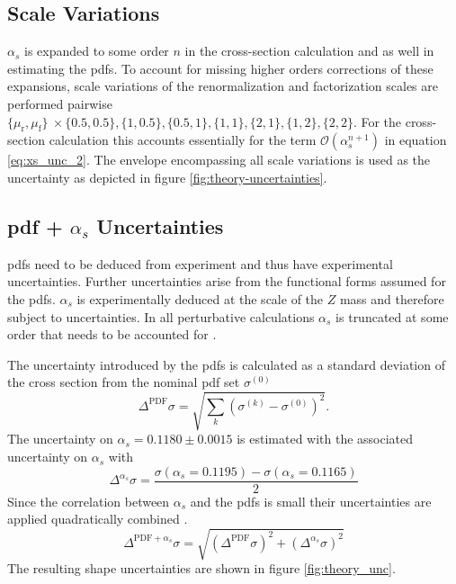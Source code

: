 \subsection{Scale Variations}
$\alpha_s$ is expanded to some order $n$ in the cross-section calculation and as well in estimating the \acp{pdf}. To account for missing higher orders corrections of these expansions, scale variations of the renormalization and factorization scales are performed pairwise $\{\mu_\text{r},\mu_\text{f}\}\ \times \{0.5,0.5\}, \{1,0.5\}, \{0.5,1\}, \{1,1\}, \{2,1\}, \{1,2\}, \{2,2\}$. For the cross-section calculation this accounts essentially for the term $\mathcal{O}(\alpha_s^{n+1})$ in equation \ref{eq:xs_unc_2}. The envelope encompassing all scale variations is used as the uncertainty as depicted in figure \ref{fig:theory-uncertainties}.


\subsection{\ac{pdf} + $\alpha_s$ Uncertainties}
\acp{pdf} need to be deduced from experiment and thus have experimental uncertainties. Further uncertainties arise from the functional forms assumed for the \acp{pdf}. $\alpha_s$ is  experimentally deduced at the scale of the $Z$ mass and therefore subject to uncertainties. In all perturbative calculations $\alpha_s$ is truncated at some order that needs to be accounted for \citep{unc_recipe,Butterworth_2016}.

The uncertainty introduced by the \acp{pdf} is calculated as a standard deviation of the cross section from the nominal \ac{pdf} set $\sigma^{(0)}$ \citep{Butterworth_2016}
\begin{equation}
    \Delta^\text{PDF}\sigma = \sqrt{\sum_k \left(\sigma^{(k)} - \sigma^{(0)}\right)^2}.
\end{equation}
The uncertainty on $\alpha_s=0.1180\pm0.0015$ is estimated with the associated uncertainty on $\alpha_s$ with
\begin{equation}
    \Delta^{\alpha_s}\sigma = \frac{\sigma(\alpha_s=0.1195)-\sigma(\alpha_s=0.1165)}{2}
\end{equation}
Since the correlation between $\alpha_s$ and the \acp{pdf} is small their uncertainties are applied quadratically combined \citep{unc_recipe,Butterworth_2016}.
\begin{equation}
    \Delta^{\text{PDF}+\alpha_s}\sigma=\sqrt{(\Delta^\text{PDF}\sigma )^2+(\Delta^{\alpha_s}\sigma)^2}
\end{equation}
The resulting shape uncertainties are shown in figure \ref{fig:theory_unc}.

